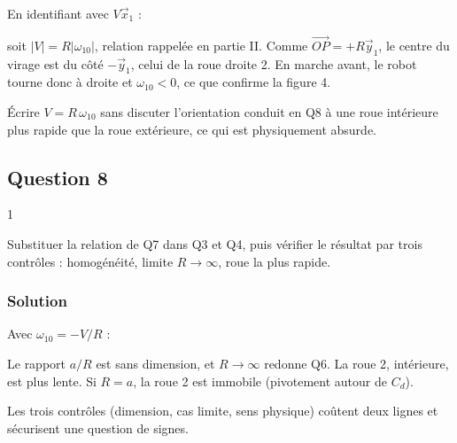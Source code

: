 \documentclass[11pt,a4paper]{article}
\newcommand{\equationajustee}[1]{%
  \sbox{\boiteequation}{$\displaystyle #1$}%
  \ifdim\wd\boiteequation>\linewidth
    \[\resizebox{\linewidth}{!}{\usebox{\boiteequation}}\]%
  \else
    \[#1\]%
  \fi}
\begin{document}
En identifiant avec \(V\vec x_1\) :

\equationajustee{\boxed{V = -R\,\omega_{10}}}

soit \(|V| = R|\omega_{10}|\), relation rappelée en partie II. Comme \(\overrightarrow{OP} = +R\vec y_1\), le centre du virage est du côté \(-\vec y_1\), celui de la roue droite 2. En marche avant, le robot tourne donc à droite et \(\omega_{10} < 0\), ce que confirme la figure 4.

\begin{piege}

Écrire \(V = R\,\omega_{10}\) sans discuter l'orientation conduit en Q8 à une roue intérieure plus rapide que la roue extérieure, ce qui est physiquement absurde.

\end{piege}

\hypertarget{question-8}{%
\subsection{Question 8}\label{question-8}}

\begin{indication}{1}

Substituer la relation de Q7 dans Q3 et Q4, puis vérifier le résultat par trois contrôles : homogénéité, limite \(R\to\infty\), roue la plus rapide.

\end{indication}

\hypertarget{solution-7}{%
\subsubsection{Solution}\label{solution-7}}

Avec \(\omega_{10} = -V/R\) :

\equationajustee{\boxed{\omega_{21} = \frac{V}{r}\left(1 - \frac{a}{R}\right)}}

\equationajustee{\boxed{\omega_{31} = \frac{V}{r}\left(1 + \frac{a}{R}\right)}}

Le rapport \(a/R\) est sans dimension, et \(R\to\infty\) redonne Q6. La roue 2, intérieure, est plus lente. Si \(R = a\), la roue 2 est immobile (pivotement autour de \(C_d\)).

\begin{methode}

Les trois contrôles (dimension, cas limite, sens physique) coûtent deux lignes et sécurisent une question de signes.

\end{methode}
\end{document}
